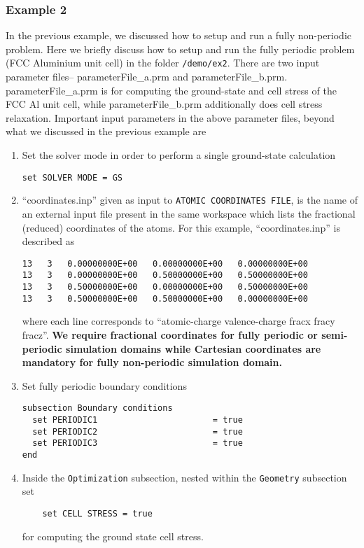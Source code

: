 \subsubsection{Example 2}\label{sec:example2}
In the previous example, we discussed how to setup and run a fully non-periodic problem.
Here we briefly discuss how to setup and run the fully periodic problem (FCC Aluminium unit cell) in the folder
\verb|/demo/ex2|. There are two input parameter files-- parameterFile\_a.prm and parameterFile\_b.prm. parameterFile\_a.prm is
for computing the ground-state and cell stress of the FCC Al unit cell, while parameterFile\_b.prm additionally does cell stress relaxation.  
Important input parameters in the above parameter files, beyond what we discussed in the previous example are
\begin{enumerate}
\item Set the solver mode in order to perform a single ground-state calculation
\begin{verbatim}
set SOLVER MODE = GS
\end{verbatim}
\item ``coordinates.inp'' given as input to \verb|ATOMIC COORDINATES FILE|, is the name of an external input file present in the same workspace which lists the fractional (reduced) coordinates of the atoms. For this example, ``coordinates.inp'' is described as 
\begin{verbatim}
13   3   0.00000000E+00   0.00000000E+00   0.00000000E+00
13   3   0.00000000E+00   0.50000000E+00   0.50000000E+00
13   3   0.50000000E+00   0.00000000E+00   0.50000000E+00
13   3   0.50000000E+00   0.50000000E+00   0.00000000E+00
\end{verbatim}
where each line corresponds to ``atomic-charge valence-charge fracx fracy fracz''. {\bf We require fractional coordinates for fully periodic or semi-periodic simulation domains while Cartesian coordinates are mandatory for fully non-periodic simulation domain.}
\item Set fully periodic boundary conditions
\begin{verbatim}	
subsection Boundary conditions
  set PERIODIC1                       = true
  set PERIODIC2                       = true
  set PERIODIC3                       = true
end
\end{verbatim}

\item Inside the \verb|Optimization| subsection, nested within the \verb|Geometry| subsection set 
\begin{verbatim}	
    set CELL STRESS = true
\end{verbatim}	
for computing the ground state cell stress. 


\end{enumerate}
